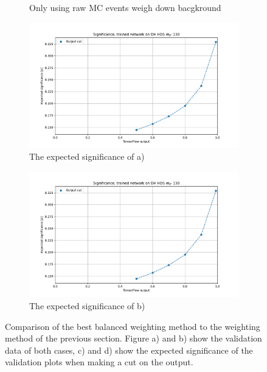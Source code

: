 \documentclass[14pt, a4paper]{book}
\begin{document}
\begin{figure}[!ht]
\begin{subfigure}[b]{0.49\textwidth}
        \caption{Only using raw MC events weigh down bacgkround}%
     \end{subfigure}
   \hfill\graphicspath{{../../../Plots/TESTING/NeuralNetwork/BALANCED_WEIGHTING/MC_WGT_SIG_UP/}}
   \begin{subfigure}[b]{0.49\textwidth}
      \centering
      \includegraphics[width=1\textwidth]{DH_HDS_mZp_130/EXP_SIG.pdf}
      \caption{The expected significance of a)}%
   \end{subfigure}
   \hfill\graphicspath{{../../../Plots/TESTING/NeuralNetwork/BALANCED_WEIGHTING/ONLY_BALANCE_MC_EVENTS_BKG_DOWN/}}
   \begin{subfigure}[b]{0.49\textwidth}
      \centering
      \includegraphics[width=1\textwidth]{DH_HDS_mZp_130/EXP_SIG.pdf}
      \caption{The expected significance of b)}%
   \end{subfigure}
     \caption{Comparison of the best balanced weighting method to the weighting method of the previous section. Figure a) and b) show the validation data of both cases, c) and d) show the expected significance of the validation plots when making a cut on the output. }%
\end{figure}
\end{document}
